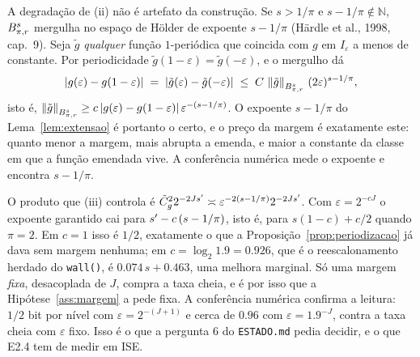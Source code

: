 \documentclass[11pt,a4paper]{article}
\begin{document}
\begin{remark}\label{rem:exato}
A degradação de (ii) não é artefato da construção. Se $s > 1/\pi$ e
$s - 1/\pi \notin \mathbb{N}$, $B^{s}_{\pi,r}$ mergulha no espaço de
Hölder de expoente $s - 1/\pi$ (Härdle et al., 1998, cap.~9). Seja
$\tilde g$ \emph{qualquer} função $1$-periódica que coincida com $g$ em
$I_{\varepsilon}$ a menos de constante. Por periodicidade
$\tilde g(1-\varepsilon) = \tilde g(-\varepsilon)$, e o mergulho dá
\[
  |g(\varepsilon) - g(1-\varepsilon)|
  \;=\; |\tilde g(\varepsilon) - \tilde g(-\varepsilon)|
  \;\le\; C\,\left\lVert \tilde g \right\rVert_{B^{s}_{\pi,r}}\,(2\varepsilon)^{s - 1/\pi},
\]
isto é, $\left\lVert \tilde g \right\rVert_{B^{s}_{\pi,r}} \ge c\,|g(\varepsilon) -
g(1-\varepsilon)|\,\varepsilon^{-(s-1/\pi)}$. O expoente $s - 1/\pi$ do
Lema~\ref{lem:extensao} é portanto o certo, e o preço da margem é
exatamente este: quanto menor a margem, mais abrupta a emenda, e maior a
constante da classe em que a função emendada vive. A conferência numérica
mede o expoente e encontra $s - 1/\pi$.
\end{remark}

\begin{remark}\label{rem:nao-encolhe}
O produto que (iii) controla é $\tilde C_{g}^{2}2^{-2Js'} \asymp
\varepsilon^{-2(s-1/\pi)}2^{-2Js'}$. Com $\varepsilon = 2^{-cJ}$ o
expoente garantido cai para $s' - c\,(s - 1/\pi)$, isto é, para
$s(1-c) + c/2$ quando $\pi = 2$. Em $c = 1$ isso é $1/2$, exatamente o que a
Proposição~\ref{prop:periodizacao} já dava sem margem nenhuma; em
$c = \log_{2}1.9 = 0.926$, que é o reescalonamento herdado do
\texttt{wall()}, é $0.074\,s + 0.463$, uma melhora marginal. Só uma margem
\emph{fixa}, desacoplada de $J$, compra a taxa cheia, e é por isso que a
Hipótese~\ref{ass:margem} a pede fixa. A conferência numérica confirma a
leitura: $1/2$ bit por nível com $\varepsilon = 2^{-(J+1)}$ e cerca de
$0{.}96$ com $\varepsilon = 1{.}9^{-J}$, contra a taxa cheia com
$\varepsilon$ fixo. Isso é o que a pergunta 6 do \texttt{ESTADO.md} pedia
decidir, e o que E2.4 tem de medir em ISE.
\end{remark}
\end{document}
